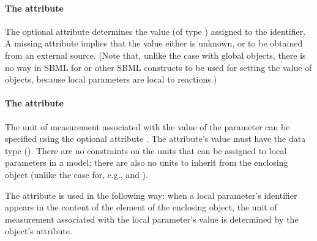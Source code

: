 

\paragraph{The  attribute}

The optional attribute  determines the value (of type
) assigned to the identifier.  A missing
 attribute implies that the value either is unknown,
or to be obtained from an external source.  (Note that, unlike the
case with global \Parameter objects, there is no way in SBML
\thisLV for \InitialAssignment or other SBML constructs to be used
for setting the value of \LocalParameter objects, because local
parameters are local to reactions.)


\paragraph{The  attribute}
\label{subsec:localparameter-units}

The unit of measurement associated with the value of the parameter
can be specified using the optional attribute .  The
attribute's value must have the data type 
().  There are no constraints on the
units that can be assigned to local parameters in a model; there
are also no units to inherit from the enclosing \Model object
(unlike the case for, e.g., \Species and \Compartment).

The  attribute is used in the following way: when a
local parameter's identifier appears in the content of the
 element of the enclosing \KineticLaw object, the unit
of measurement associated with the local parameter's value is
determined by the \LocalParameter object's 
attribute.


